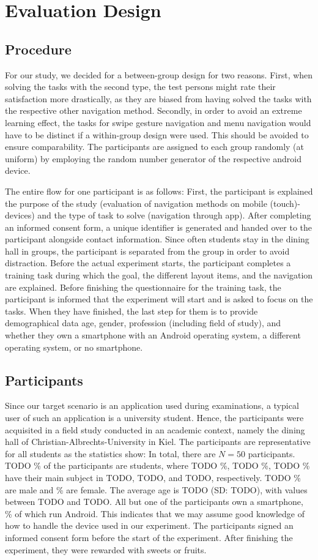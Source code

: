 \documentclass{sig-alternate-05-2015}
\begin{document}
\section{Evaluation Design}
\subsection{Procedure}
For our study, we decided for a between-group design for two reasons. First,
when solving the tasks with the second type, the test persons might rate their
satisfaction more drastically, as they are biased from having solved the tasks
with the respective other navigation method. Secondly, in order to avoid an
extreme learning effect, the tasks for swipe gesture navigation and menu
navigation would have to be distinct if a within-group design were used. This
should be avoided to ensure comparability. The participants are assigned to
each group randomly (at uniform) by employing the random number generator of
the respective android device.

The entire flow for one participant is as follows: First, the participant is explained
the purpose of the study (evaluation of navigation methods on mobile (touch)-devices) and the
type of task to solve (navigation through app). After completing an informed consent form, a unique
identifier is generated and handed over to the participant alongside contact information. Since often students
stay in the dining hall in groups, the participant is separated from the group in order to avoid distraction. 
Before the actual experiment starts, the participant completes a training task during which the goal, the
different layout items, and the navigation are explained. Before finishing the questionnaire for the training
task, the participant is informed that the experiment will start and is asked to focus on the tasks. When they have
finished, the last step for them is to provide demographical data age, gender, profession (including field of study),
and whether they own a smartphone with an Android operating system, a different operating system, or no smartphone.
\subsection{Participants}
Since our target scenario is an application used during examinations,
a typical user of such an application is a university student. Hence, 
the participants were acquisited in a field study conducted in an academic context,
namely the dining hall of Christian-Albrechts-University in Kiel. The participants are
representative for all students as the statistics show: In total, there are 
$N = 50$ participants. TODO \% of the participants are
students, where TODO \%, TODO \%, TODO \% have their main subject in TODO, TODO, and TODO,
respectively. TODO \% are male and \% are female. The average age is TODO (SD: TODO), 
with values between TODO and TODO. 
All but one of the participants own a
smartphone, \% of which run Android. This indicates that we may assume good knowledge
of how to handle the device used in our experiment.
The participants signed an informed consent form before the start of the experiment. After
finishing the experiment, they were rewarded with sweets or fruits.
\end{document}

